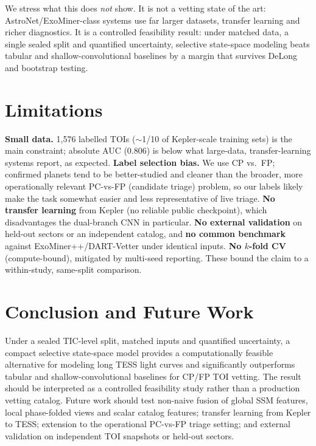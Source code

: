 \documentclass[conference]{IEEEtran}
\begin{document}
We stress what this does \emph{not} show. It is not a vetting state of the art:
AstroNet/ExoMiner-class systems use far larger datasets, transfer learning and
richer diagnostics. It is a controlled feasibility result: under matched data, a
single sealed split and quantified uncertainty, selective state-space modeling
beats tabular and shallow-convolutional baselines by a margin that survives DeLong
and bootstrap testing.

\section{Limitations}

\textbf{Small data.} 1{,}576 labelled TOIs ($\sim$1/10 of Kepler-scale training
sets) is the main constraint; absolute AUC (0.806) is below what large-data,
transfer-learning systems report, as expected. \textbf{Label selection bias.}
We use CP vs.\ FP; confirmed planets tend to be better-studied and cleaner than
the broader, more operationally relevant PC-vs-FP (candidate triage) problem, so
our labels likely make the task somewhat easier and less representative of live
triage. \textbf{No transfer learning} from Kepler (no reliable public checkpoint),
which disadvantages the dual-branch CNN in particular. \textbf{No external
validation} on held-out sectors or an independent catalog, and \textbf{no common
benchmark} against ExoMiner++/DART-Vetter under identical inputs. \textbf{No
$k$-fold CV} (compute-bound), mitigated by multi-seed reporting. These bound the
claim to a within-study, same-split comparison.

\section{Conclusion and Future Work}

Under a sealed TIC-level split, matched inputs and quantified uncertainty, a
compact selective state-space model provides a computationally feasible alternative
for modeling long TESS light curves and significantly outperforms tabular and
shallow-convolutional baselines for CP/FP TOI vetting. The result should be
interpreted as a controlled feasibility study rather than a production vetting
catalog. Future work should test non-naive fusion of global SSM features, local
phase-folded views and scalar catalog features; transfer learning from Kepler to
TESS; extension to the operational PC-vs-FP triage setting; and external validation
on independent TOI snapshots or held-out sectors.
\end{document}
